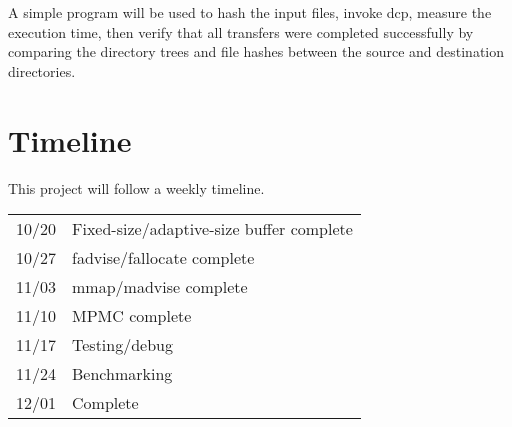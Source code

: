 \documentclass[12pt]{article}
\begin{document}
A simple program will be used to hash the input files, invoke dcp, measure the
execution time, then verify that all transfers were completed
successfully by comparing the directory trees and file hashes between
the source and destination directories.

\section{Timeline}
This project will follow a weekly timeline. \\
\begin{tabular}{|l | l|}
\hline
10/20 & Fixed-size/adaptive-size buffer complete \\
10/27 & fadvise/fallocate complete \\
11/03 & mmap/madvise complete \\
11/10 & MPMC complete \\
11/17 & Testing/debug \\
11/24 & Benchmarking \\
12/01 & Complete \\
\hline
\end{tabular}
\end{document}
